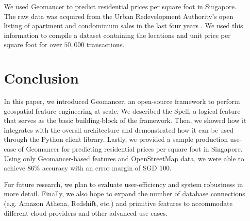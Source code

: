 \documentclass{article}
\begin{document}
We used Geomancer to predict residential prices per square foot in Singapore. 
The raw data was acquired from the Urban Redevelopment Authority's
open listing of apartment and condominium sales in the last
four years \cite{ura2019property}. We used this information to compile a
dataset containing the locations and unit price per square foot for over $50,000$
transactions.






\section{Conclusion}

In this paper, we introduced Geomancer, an open-source framework to perform
geospatial feature engineering at scale. We described the Spell, a logical
feature that serves as the basic building-block of the framework. Then, we
showed how it integrates with the overall architecture and demonstrated how it
can be used through the Python client library. Lastly, we provided a sample
production use-case of Geomancer for predicting residential prices per square
foot in Singapore. Using only Geomancer-based features and OpenStreetMap data,
we were able to achieve $86\%$ accuracy with an error margin of SGD 100. 

For future research, we plan to evaluate user-efficiency and system robustness
in more detail. Finally, we also hope to expand the number of database
connections (e.g. Amazon Athena, Redshift, etc.) and primitive features to
accommodate different cloud providers and other advanced use-cases.

 


\end{document}
